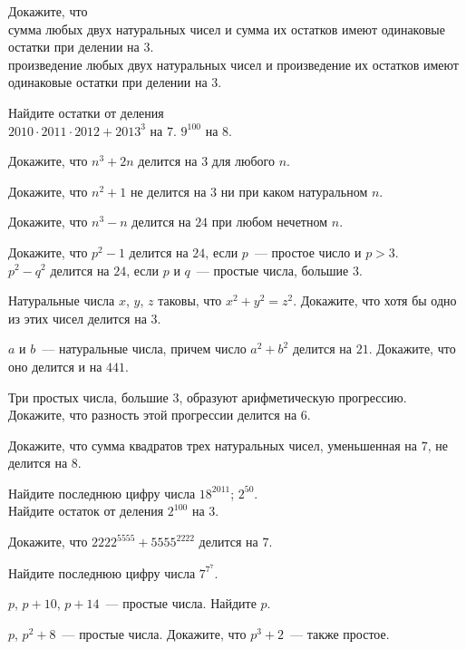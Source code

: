 
\begin{problems}

\item
Докажите, что
\\\sbp
сумма любых двух натуральных чисел и сумма их остатков имеют одинаковые остатки
при делении на 3.
\\\sbp
произведение любых двух натуральных чисел и произведение их остатков имеют
одинаковые остатки при делении на 3.

\item
Найдите остатки от деления
\\
\sbp $2010 \cdot 2011 \cdot 2012 + 2013^3$ на $7$.
\quad
\sbp $9^{100}$ на $8$.

\item
Докажите, что $n^3 + 2 n$ делится на $3$ для любого $n$.

\item
Докажите, что $n^2 + 1$ не делится на $3$ ни при каком натуральном $n$.

\item
Докажите, что $n^3 - n$ делится на $24$ при любом нечетном $n$.

\item
Докажите, что
\quad
\sbp
$p^2 - 1$ делится на $24$, если $p$~--- простое число и $p > 3$.
\\
\sbp
$p^2 - q^2$ делится на $24$, если $p$ и $q$~--- простые числа, большие $3$.

\item
Натуральные числа $x$, $y$, $z$ таковы, что $x^2 + y^2 = z^2$.
Докажите, что хотя бы одно из этих чисел делится на $3$.

\item
$a$ и $b$~--- натуральные числа, причем число $a^2 + b^2$ делится на $21$.
Докажите, что оно делится и на $441$.

\item
Три простых числа, большие $3$, образуют арифметическую прогрессию.
Докажите, что разность этой прогрессии делится на $6$.

\item
Докажите, что сумма квадратов трех натуральных чисел, уменьшенная на $7$, не
делится на $8$.

\item
Найдите последнюю цифру числа
\quad
\sbp $18^{2011}$;
\quad
\sbp $2^{50}$.
\\\sbp
Найдите остаток от деления $2^{100}$ на $3$.

\item
Докажите, что $2222^{5555} + 5555^{2222}$ делится на $7$.

\item
Найдите последнюю цифру числа $7^{7^{7}}$.

\item
$p$, $p + 10$, $p + 14$~--- простые числа.
Найдите $p$.

\item
$p$, $p^2 + 8$~--- простые числа.
Докажите, что $p^3 + 2$~--- также простое.

\end{problems}

